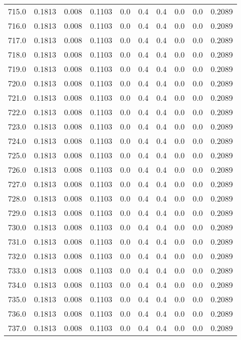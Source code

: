\begin{longtable}{lrrrrrrrrr}
715.0 & 0.1813 & 0.008 & 0.1103 & 0.0 & 0.4 & 0.4 & 0.0 & 0.0 & 0.2089 \\
716.0 & 0.1813 & 0.008 & 0.1103 & 0.0 & 0.4 & 0.4 & 0.0 & 0.0 & 0.2089 \\
717.0 & 0.1813 & 0.008 & 0.1103 & 0.0 & 0.4 & 0.4 & 0.0 & 0.0 & 0.2089 \\
718.0 & 0.1813 & 0.008 & 0.1103 & 0.0 & 0.4 & 0.4 & 0.0 & 0.0 & 0.2089 \\
719.0 & 0.1813 & 0.008 & 0.1103 & 0.0 & 0.4 & 0.4 & 0.0 & 0.0 & 0.2089 \\
720.0 & 0.1813 & 0.008 & 0.1103 & 0.0 & 0.4 & 0.4 & 0.0 & 0.0 & 0.2089 \\
721.0 & 0.1813 & 0.008 & 0.1103 & 0.0 & 0.4 & 0.4 & 0.0 & 0.0 & 0.2089 \\
722.0 & 0.1813 & 0.008 & 0.1103 & 0.0 & 0.4 & 0.4 & 0.0 & 0.0 & 0.2089 \\
723.0 & 0.1813 & 0.008 & 0.1103 & 0.0 & 0.4 & 0.4 & 0.0 & 0.0 & 0.2089 \\
724.0 & 0.1813 & 0.008 & 0.1103 & 0.0 & 0.4 & 0.4 & 0.0 & 0.0 & 0.2089 \\
725.0 & 0.1813 & 0.008 & 0.1103 & 0.0 & 0.4 & 0.4 & 0.0 & 0.0 & 0.2089 \\
726.0 & 0.1813 & 0.008 & 0.1103 & 0.0 & 0.4 & 0.4 & 0.0 & 0.0 & 0.2089 \\
727.0 & 0.1813 & 0.008 & 0.1103 & 0.0 & 0.4 & 0.4 & 0.0 & 0.0 & 0.2089 \\
728.0 & 0.1813 & 0.008 & 0.1103 & 0.0 & 0.4 & 0.4 & 0.0 & 0.0 & 0.2089 \\
729.0 & 0.1813 & 0.008 & 0.1103 & 0.0 & 0.4 & 0.4 & 0.0 & 0.0 & 0.2089 \\
730.0 & 0.1813 & 0.008 & 0.1103 & 0.0 & 0.4 & 0.4 & 0.0 & 0.0 & 0.2089 \\
731.0 & 0.1813 & 0.008 & 0.1103 & 0.0 & 0.4 & 0.4 & 0.0 & 0.0 & 0.2089 \\
732.0 & 0.1813 & 0.008 & 0.1103 & 0.0 & 0.4 & 0.4 & 0.0 & 0.0 & 0.2089 \\
733.0 & 0.1813 & 0.008 & 0.1103 & 0.0 & 0.4 & 0.4 & 0.0 & 0.0 & 0.2089 \\
734.0 & 0.1813 & 0.008 & 0.1103 & 0.0 & 0.4 & 0.4 & 0.0 & 0.0 & 0.2089 \\
735.0 & 0.1813 & 0.008 & 0.1103 & 0.0 & 0.4 & 0.4 & 0.0 & 0.0 & 0.2089 \\
736.0 & 0.1813 & 0.008 & 0.1103 & 0.0 & 0.4 & 0.4 & 0.0 & 0.0 & 0.2089 \\
737.0 & 0.1813 & 0.008 & 0.1103 & 0.0 & 0.4 & 0.4 & 0.0 & 0.0 & 0.2089 \\

\end{longtable}
